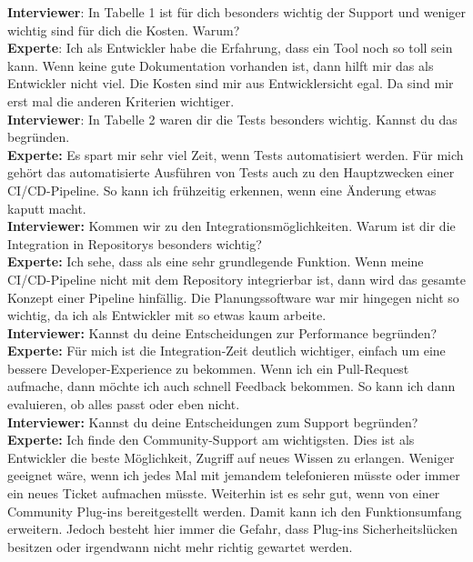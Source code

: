 \begin{center}
    \begin{figure}[H]
        \centering
        \label{fig:gew_23}
    \end{figure}	
\end{center}
\newpage

\resetlinenumber
\begin{linenumbers}
    \textbf{Interviewer}: In Tabelle 1 ist für dich besonders wichtig der Support und weniger wichtig sind für dich die Kosten. Warum?\\
    \textbf{Experte}: Ich als Entwickler habe die Erfahrung, dass ein Tool noch so toll sein kann. Wenn keine gute Dokumentation vorhanden ist, dann hilft mir das als Entwickler nicht viel. Die Kosten sind mir aus Entwicklersicht egal. Da sind mir erst mal die anderen Kriterien wichtiger.\\
    \textbf{Interviewer}: In Tabelle 2 waren dir die Tests besonders wichtig. Kannst du das begründen.\\
    \textbf{Experte:} Es spart mir sehr viel Zeit, wenn Tests automatisiert werden. Für mich gehört das automatisierte Ausführen von Tests auch zu den Hauptzwecken einer CI/CD-Pipeline. So kann ich frühzeitig erkennen, wenn eine Änderung etwas kaputt macht.\\
    \textbf{Interviewer:} Kommen wir zu den Integrationsmöglichkeiten. Warum ist dir die Integration in Repositorys besonders wichtig?\\
    \textbf{Experte:} Ich sehe, dass als eine sehr grundlegende Funktion. Wenn meine CI/CD-Pipeline nicht mit dem Repository integrierbar ist, dann wird das gesamte Konzept einer Pipeline hinfällig. Die Planungssoftware war mir hingegen nicht so wichtig, da ich als Entwickler mit so etwas kaum arbeite.\\
    \textbf{Interviewer:} Kannst du deine Entscheidungen zur Performance begründen?\\
    \textbf{Experte:} Für mich ist die Integration-Zeit deutlich wichtiger, einfach um eine bessere Developer-Experience zu bekommen. Wenn ich ein Pull-Request aufmache, dann möchte ich auch schnell Feedback bekommen. So kann ich dann evaluieren, ob alles passt oder eben nicht.\\
    \textbf{Interviewer:} Kannst du deine Entscheidungen zum Support begründen?\\
    \textbf{Experte:} Ich finde den Community-Support am wichtigsten. Dies ist als Entwickler die beste Möglichkeit, Zugriff auf neues Wissen zu erlangen. Weniger geeignet wäre, wenn ich jedes Mal mit jemandem telefonieren müsste oder immer ein neues Ticket aufmachen müsste. Weiterhin ist es sehr gut, wenn von einer Community Plug-ins bereitgestellt werden. Damit kann ich den Funktionsumfang erweitern. Jedoch besteht hier immer die Gefahr, dass Plug-ins Sicherheitslücken besitzen oder irgendwann nicht mehr richtig gewartet werden.\\

\end{linenumbers}
